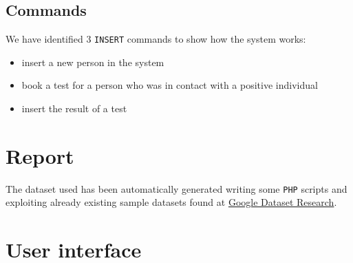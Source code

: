 \documentclass{article}
\begin{document}
\subsection{Commands}
We have identified 3 \verb |INSERT| commands to show how the system works:
\begin{itemize}
    \item insert a new person in the system
    \item book a test for a person who was in contact with a positive individual
    \item insert the result of a test
\end{itemize}
\section{Report}
The dataset used has been automatically generated writing some \verb |PHP| scripts and exploiting already existing sample datasets found at \href{https://datasetsearch.research.google.com}{Google Dataset Research}.
\section{User interface}
\end{document}
